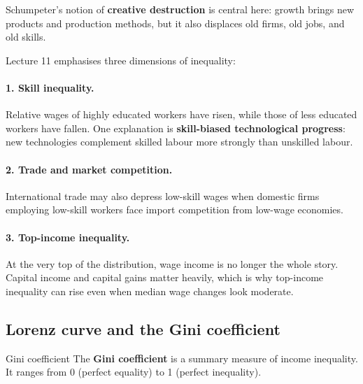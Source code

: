 \documentclass[12pt]{article}
\begin{document}
Schumpeter's notion of \textbf{creative destruction} is central here: growth brings new products and production methods, but it also displaces old firms, old jobs, and old skills.

Lecture 11 emphasises three dimensions of inequality:

\paragraph{1. Skill inequality.}
Relative wages of highly educated workers have risen, while those of less educated workers have fallen. One explanation is \textbf{skill-biased technological progress}: new technologies complement skilled labour more strongly than unskilled labour.

\paragraph{2. Trade and market competition.}
International trade may also depress low-skill wages when domestic firms employing low-skill workers face import competition from low-wage economies.

\paragraph{3. Top-income inequality.}
At the very top of the distribution, wage income is no longer the whole story. Capital income and capital gains matter heavily, which is why top-income inequality can rise even when median wage changes look moderate.

\subsection{Lorenz curve and the Gini coefficient}

\begin{definition}{Gini coefficient}{}
The \textbf{Gini coefficient} is a summary measure of income inequality. It ranges from 0 (perfect equality) to 1 (perfect inequality).
\end{definition}

\begin{center}
\end{center}
\end{document}
